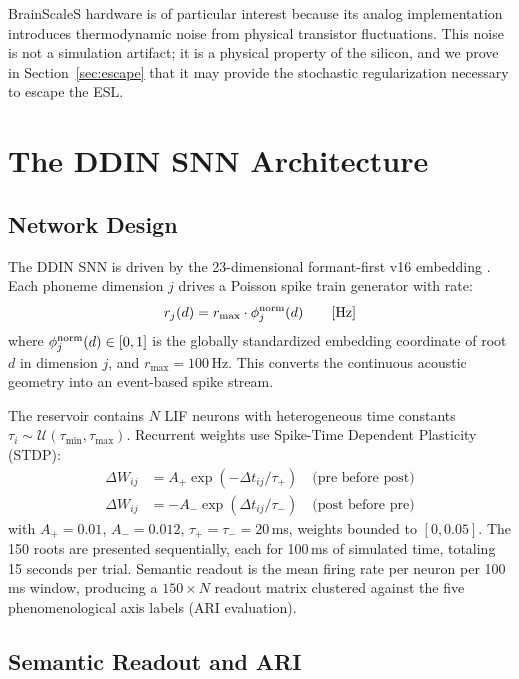 \documentclass{article}
\begin{document}
BrainScaleS hardware is of particular interest because its analog implementation introduces thermodynamic noise from physical transistor fluctuations. This noise is not a simulation artifact; it is a physical property of the silicon, and we prove in Section~\ref{sec:escape} that it may provide the stochastic regularization necessary to escape the ESL.

\section{The DDIN SNN Architecture}
\label{sec:architecture}

\subsection{Network Design}

The DDIN SNN is driven by the 23-dimensional formant-first v16 embedding \citep{kumar2026ddin}. Each phoneme dimension $j$ drives a Poisson spike train generator with rate:
\begin{equation}
r_j(d) = r_{\max} \cdot \phi_j^{\rm norm}(d) \qquad [\mathrm{Hz}]
\label{eq:poisson}
\end{equation}
where $\phi_j^{\rm norm}(d) \in [0,1]$ is the globally standardized embedding coordinate of root $d$ in dimension $j$, and $r_{\max} = 100$\,Hz. This converts the continuous acoustic geometry into an event-based spike stream.

The reservoir contains $N$ LIF neurons with heterogeneous time constants $\tau_i \sim \mathcal{U}(\tau_{\min}, \tau_{\max})$. Recurrent weights use Spike-Time Dependent Plasticity (STDP):
\begin{align}
\Delta W_{ij} &= A_+ \exp(-\Delta t_{ij}/\tau_+) \quad \text{(pre before post)}
\label{eq:stdp_ltp}\\
\Delta W_{ij} &= -A_- \exp(\Delta t_{ij}/\tau_-) \quad \text{(post before pre)}
\label{eq:stdp_ltd}
\end{align}
with $A_+ = 0.01$, $A_- = 0.012$, $\tau_+ = \tau_- = 20$\,ms, weights bounded to $[0, 0.05]$. The 150 roots are presented sequentially, each for 100\,ms of simulated time, totaling 15 seconds per trial. Semantic readout is the mean firing rate per neuron per 100\,ms window, producing a $150 \times N$ readout matrix clustered against the five phenomenological axis labels (ARI evaluation).

\subsection{Semantic Readout and ARI}
\end{document}
